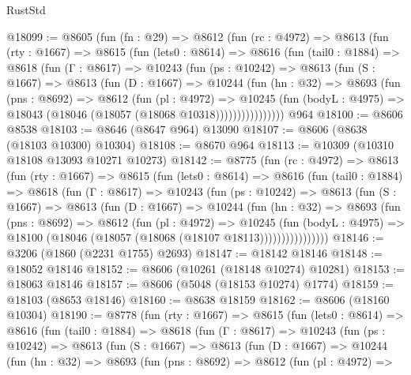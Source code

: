 \begin{lexlean}{RustStd}
\begin{coremodule}
@18099 := @8605
    (fun (fn : @29) =>
    @8612
      (fun (rc : @4972) =>
      @8613
        (fun (rty : @1667) =>
        @8615
          (fun (lets0 : @8614) =>
          @8616
            (fun (tail0 : @1884) =>
            @8618
              (fun (Γ : @8617) =>
              @10243
                (fun (ps : @10242) =>
                @8613
                  (fun (S : @1667) =>
                  @8613
                    (fun (D : @1667) =>
                    @10244
                      (fun (hn : @32) =>
                      @8693
                        (fun (pns : @8692) =>
                        @8612
                          (fun (pl : @4972) =>
                          @10245
                            (fun (bodyL : @4975) =>
                            @18043 (@18046 (@18057 (@18068 @10318))))))))))))))))
    @964
@18100 := @8606 @8538
@18103 := @8646 (@8647 @964) @13090
@18107 := @8606 (@8638 (@18103 @10300) @10304)
@18108 := @8670 @964
@18113 := @10309 (@10310 @18108 @13093 @10271 @10273)
@18142 := @8775
    (fun (rc : @4972) =>
    @8613
      (fun (rty : @1667) =>
      @8615
        (fun (lets0 : @8614) =>
        @8616
          (fun (tail0 : @1884) =>
          @8618
            (fun (Γ : @8617) =>
            @10243
              (fun (ps : @10242) =>
              @8613
                (fun (S : @1667) =>
                @8613
                  (fun (D : @1667) =>
                  @10244
                    (fun (hn : @32) =>
                    @8693
                      (fun (pns : @8692) =>
                      @8612
                        (fun (pl : @4972) =>
                        @10245
                          (fun (bodyL : @4975) =>
                          @18100 (@18046 (@18057 (@18068 (@18107 @18113))))))))))))))))
@18146 := @3206 (@1860 (@2231 @1755) @2693)
@18147 := @18142 @18146
@18148 := @18052 @18146
@18152 := @8606 (@10261 (@18148 @10274) @10281)
@18153 := @18063 @18146
@18157 := @8606 (@5048 (@18153 @10274) @1774)
@18159 := @18103 (@8653 @18146)
@18160 := @8638 @18159
@18162 := @8606 (@18160 @10304)
@18190 := @8778
    (fun (rty : @1667) =>
    @8615
      (fun (lets0 : @8614) =>
      @8616
        (fun (tail0 : @1884) =>
        @8618
          (fun (Γ : @8617) =>
          @10243
            (fun (ps : @10242) =>
            @8613
              (fun (S : @1667) =>
              @8613
                (fun (D : @1667) =>
                @10244
                  (fun (hn : @32) =>
                  @8693
                    (fun (pns : @8692) =>
                    @8612
                      (fun (pl : @4972) =>

\end{coremodule}
\end{lexlean}

